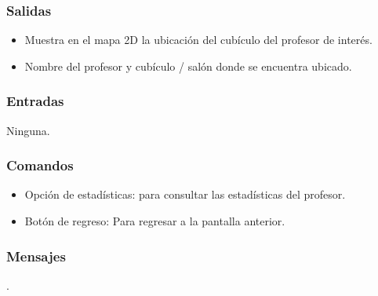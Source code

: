 \subsubsection{Salidas}
	\begin{itemize}
		\item Muestra en el mapa 2D la ubicación del cubículo del profesor de interés.
		\item Nombre del profesor y cubículo / salón donde se encuentra ubicado.
	\end{itemize}

\subsubsection{Entradas}
	\noindent
	Ninguna.

\subsubsection{Comandos}
\begin{itemize}
	\item Opción de estadísticas: para consultar las estadísticas del profesor.
	\item Botón de regreso: Para regresar a la pantalla anterior.
\end{itemize}

\subsubsection{Mensajes}
	\noindent
	.






